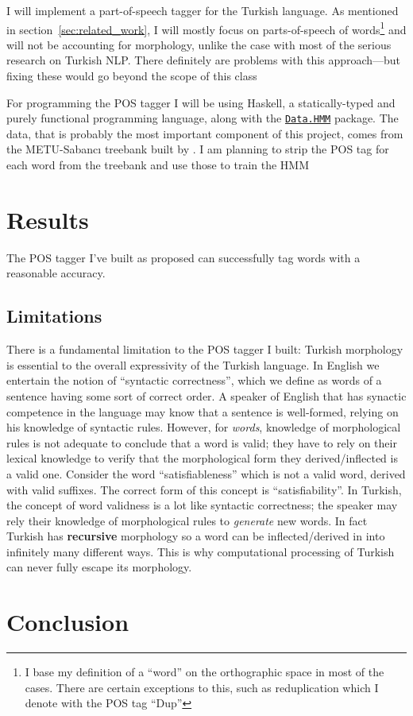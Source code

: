 \documentclass{article}
\newcommand{\hmmURL}{https://hackage.haskell.org/package/hmm-0.2.1.1/docs/Data-HMM.html}
\begin{document}
I will implement a part-of-speech tagger for the Turkish language. As
mentioned in section~\ref{sec:related_work}, I will mostly focus on parts-of-speech
of words\footnote{I base my definition of a ``word'' on the orthographic space in
  most of the cases. There are certain exceptions to this, such as
  reduplication which I denote with the POS tag ``Dup''} and will not be accounting for morphology, unlike
the case with most of the serious research on Turkish NLP. There definitely are
problems with this approach---but fixing these would go beyond the scope of
this class

For programming the POS tagger I will be using Haskell, a statically-typed and purely
functional programming language, along with the
\href{\hmmURL}{\texttt{Data.HMM}} package.
The data, that is probably the most important component of this
project, comes from the METU-Sabanc{\i} treebank built by
\citet{oflazer2003building}.  I am planning to strip the POS tag for each word from
the treebank and use those to train the HMM

\section{Results}

The POS tagger I've built as proposed can successfully tag words with a
reasonable accuracy.

\subsection{Limitations}
There is a fundamental limitation to the POS tagger I built: Turkish morphology
is essential to the overall expressivity of the Turkish language. In English we
entertain the notion of ``syntactic correctness'', which we define as words of a
sentence having some sort of correct order. A speaker of English that has
synactic competence in the language \citep{bachman1990} may know that a sentence
is well-formed, relying on his knowledge of syntactic rules. However, for
\textit{words}, knowledge of morphological rules is not adequate to conclude
that a word is valid; they have to rely on their lexical knowledge to verify
that the morphological form they derived/inflected is a valid one. Consider the
word ``satisfiableness'' which is not a valid word, derived with valid suffixes.
The correct form of this concept is ``satisfiability''. In Turkish, the concept
of word validness is a lot like syntactic correctness; the speaker may rely
their knowledge of morphological rules to \textit{generate} new words. In fact
Turkish has \textbf{recursive} morphology \citep{kabak2001} so a word can be
inflected/derived in into infinitely many different ways. This is why
computational processing of Turkish can never fully escape its morphology.

\section{Conclusion}





\end{document}
